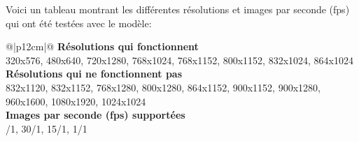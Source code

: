 \par Voici un tableau montrant les différentes résolutions et images par seconde (\acrshort{fps}) qui ont été testées avec le modèle:
{
    \renewcommand*{\arraystretch}{1.4}
    \begin{table}[ht]
    \centering
    \caption{Résolutions et images par seconde (\acrshort{fps}) testés}\label{table:resolutions_tested}
    \vspace{0.3em} %
    \begin{tabular}{{@{}|p{12cm}|@{}}}
         \hline
         \textbf{Résolutions qui fonctionnent}\\
         \hline
        320x576, 480x640, 720x1280, 768x1024, 768x1152, 800x1152, 832x1024, 864x1024\\
        \hline
        \textbf{Résolutions qui ne fonctionnent pas}\\
        \hline
        832x1120, 832x1152, 768x1280, 800x1280, 864x1152, 900x1152, 900x1280, 960x1600, 1080x1920, 1024x1024\\
        \hline
        \textbf{Images par seconde (\acrshort{fps}) supportées}\\
        /1, 30/1, 15/1, 1/1\\
        \hline
    \end{tabular}
    \end{table}
}